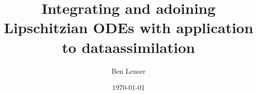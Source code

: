 \documentclass[
	12pt,
	a4paper,
	twoside,
	titlepage,
	parskip=half,
	BCOR=10mm,
	bibliography=totoc,
	headings=normal,
	DIV=calc,
]{scrreprt}
\begin{document}
\author{Ben Lenser}
\title{Integrating and adoining Lipschitzian ODEs with application to dataassimilation}

\date{\today}

  

\cleardoublepage
{}

% 











\begin{spacing}{1}
 \printbibliography
\end{spacing}

\appendix




\end{document}
